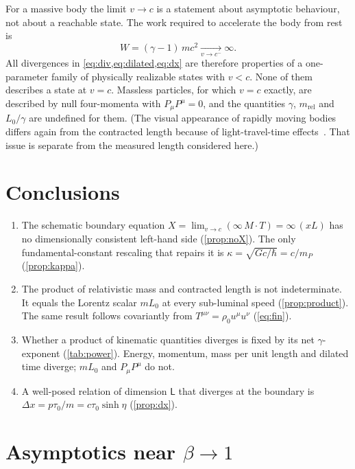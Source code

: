 \documentclass[11pt,a4paper]{article}
\theoremstyle{definition}
\theoremstyle{remark}
\newcommand{\mrel}{m_{\mathrm{rel}}}
\newcommand{\sfL}{\mathsf{L}}
\begin{document}
For a massive body the limit $v\to c$ is a statement about asymptotic
behaviour, not about a reachable state. The work required to accelerate the
body from rest is
\begin{equation}
  W=(\gamma-1)\,mc^{2}\xrightarrow[v\to c^-]{}\infty .
  \label{eq:work}
\end{equation}
All divergences in \cref{eq:div,eq:dilated,eq:dx} are therefore properties of
a one-parameter family of physically realizable states with $v<c$. None of
them describes a state at $v=c$. Massless particles, for which $v=c$ exactly,
are described by null four-momenta with $P_\mu P^\mu=0$, and the quantities
$\gamma$, $\mrel$ and $L_0/\gamma$ are undefined for them. (The visual
appearance of rapidly moving bodies differs again from the contracted length
because of light-travel-time effects~\cite{Terrell1959,Penrose1959}. That
issue is separate from the measured length considered here.)

\section{Conclusions}\label{sec:conclusions}

\begin{enumerate}
  \item The schematic boundary equation
  $X=\lim_{v\to c}(\infty\,M\cdot T)=\infty\,(xL)$ has no dimensionally
  consistent left-hand side (\cref{prop:noX}). The only fundamental-constant
  rescaling that repairs it is $\kappa=\sqrt{Gc/\hbar}=c/m_P$
  (\cref{prop:kappa}).
  \item The product of relativistic mass and contracted length is not
  indeterminate. It equals the Lorentz scalar $mL_0$ at every sub-luminal
  speed (\cref{prop:product}). The same result follows covariantly from
  $T^{\mu\nu}=\rho_0u^\mu u^\nu$ (\cref{eq:fin}).
  \item Whether a product of kinematic quantities diverges is fixed by its
  net $\gamma$-exponent (\cref{tab:power}). Energy, momentum, mass per unit
  length and dilated time diverge; $mL_0$ and $P_\mu P^\mu$ do not.
  \item A well-posed relation of dimension $\sfL$ that diverges at the
  boundary is $\Delta x=p\tau_0/m=c\tau_0\sinh\eta$ (\cref{prop:dx}).
\end{enumerate}

\appendix
\section{\texorpdfstring{Asymptotics near $\beta\to1$}{Asymptotics near beta -> 1}}\label{app:asymptotics}
\end{document}
